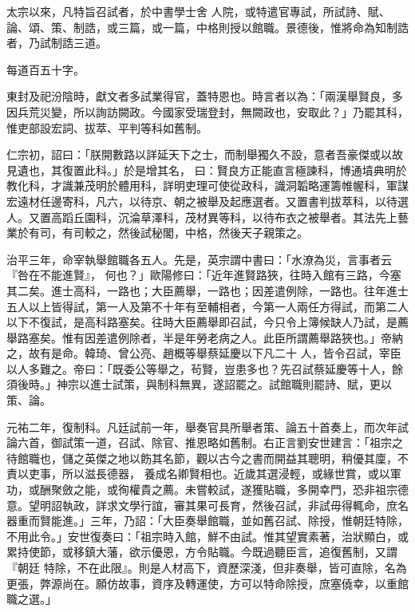 \begin{pinyinscope}
 太宗以來，凡特旨召試者，於中書學士舍
 人院，或特遣官專試，所試詩、賦、論、頌、策、制誥，或三篇，或一篇，中格則授以館職。景德後，惟將命為知制誥者，乃試制誥三道。



 每道百五十字。



 東封及祀汾陰時，獻文者多試業得官，蓋特恩也。時言者以為：「兩漢舉賢良，多因兵荒災變，所以詢訪闕政。今國家受瑞登封，無闕政也，安取此？」乃罷其科，惟吏部設宏詞、拔萃、平判等科如舊制。



 仁宗初，詔曰：「朕開數路以詳延天下之士，而制舉獨久不設，意者吾豪傑或以故見遺也，其復置此科。」於是增其名，
 曰：賢良方正能直言極諫科，博通墳典明於教化科，才識兼茂明於體用科，詳明吏理可使從政科，識洞韜略運籌帷幄科，軍謀宏遠材任邊寄科，凡六，以待京、朝之被舉及起應選者。又置書判拔萃科，以待選人。又置高蹈丘園科，沉淪草澤科，茂材異等科，以待布衣之被舉者。其法先上藝業於有司，有司較之，然後試秘閣，中格，然後天子親策之。



 治平三年，命宰執舉館職各五人。先是，英宗謂中書曰：「水潦為災，言事者云『咎在不能進賢』，
 何也？」歐陽修曰：「近年進賢路狹，往時入館有三路，今塞其二矣。進士高科，一路也；大臣薦舉，一路也；因差遣例除，一路也。往年進士五人以上皆得試，第一人及第不十年有至輔相者，今第一人兩任方得試，而第二人以下不復試，是高科路塞矣。往時大臣薦舉即召試，今只令上簿候缺人乃試，是薦舉路塞矣。惟有因差遣例除者，半是年勞老病之人。此臣所謂薦舉路狹也。」帝納之，故有是命。韓琦、曾公亮、趙概等舉蔡延慶以下凡二十
 人，皆令召試，宰臣以人多難之。帝曰：「既委公等舉之，茍賢，豈患多也？先召試蔡延慶等十人，餘須後時。」神宗以進士試策，與制科無異，遂詔罷之。試館職則罷詩、賦，更以策、論。



 元祐二年，復制科。凡廷試前一年，舉奏官具所舉者策、論五十首奏上，而次年試論六首，御試策一道，召試、除官、推恩略如舊制。右正言劉安世建言：「祖宗之待館職也，儲之英傑之地以飭其名節，觀以古今之書而開益其聰明，稍優其廩，不責以吏事，所以滋長德器，
 養成名卿賢相也。近歲其選浸輕，或緣世賞，或以軍功，或酬聚斂之能，或徇權貴之薦。未嘗較試，遂獲貼職，多開幸門，恐非祖宗德意。望明詔執政，詳求文學行誼，審其果可長育，然後召試，非試毋得輒命，庶名器重而賢能進。」三年，乃詔：「大臣奏舉館職，並如舊召試、除授，惟朝廷特除，不用此令。」安世復奏曰：「祖宗時入館，鮮不由試。惟其望實素著，治狀顯白，或累持使節，或移鎮大藩，欲示優恩，方令貼職。今既過聽臣言，追復舊制，又謂『朝廷
 特除，不在此限』。則是人材高下，資歷深淺，但非奏舉，皆可直除，名為更張，弊源尚在。願仿故事，資序及轉運使，方可以特命除授，庶塞僥幸，以重館職之選。」




\end{pinyinscope}
